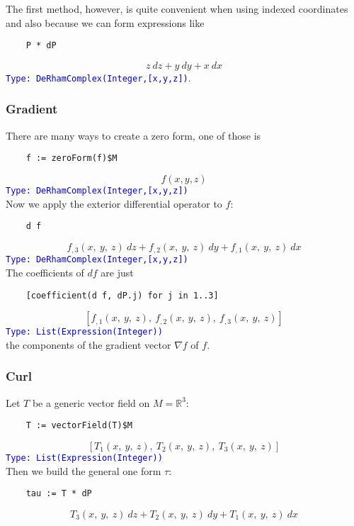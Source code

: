 \documentclass[12pt,a4paper]{article}
\newcommand{\RR}[1]{\mathbb{R}^{#1}}
\newcommand{\type}[1]{\textcolor{blue}{\tt\tiny #1}}
\begin{document}
The first method, however, is quite convenient when using indexed coordinates
and also because we can form expressions like
\begin{lstlisting}
    P * dP
\end{lstlisting}
\begin{displaymath}
   z\ dz + y\ dy + x\ dx
\end{displaymath}
\type{Type: DeRhamComplex(Integer,[x,y,z])}.
%
\subsubsection{Gradient} 
There are many ways to create a zero form, one of those is
\begin{lstlisting}
    f := zeroForm(f)$M
\end{lstlisting}
\begin{displaymath}
   f(x,y,z)
\end{displaymath}
\type{Type: DeRhamComplex(Integer,[x,y,z])}
\\
Now we apply the exterior differential operator to $f$:
\begin{lstlisting}
    d f
\end{lstlisting}
\begin{displaymath}
   {{{f _ {{,3}}}\left(
   {x, \: y, \: z}\right)}
   \  dz}+{{{f _ {{,2}}}\left({x, \: y, \: z}
   \right)}\  dy}+{{{f _ {{,1}}}
   \left({x, \: y, \: z}\right)}\  dx}
\end{displaymath}
\type{Type: DeRhamComplex(Integer,[x,y,z])}
\\
The coefficients of $df$ are just
\begin{lstlisting}
    [coefficient(d f, dP.j) for j in 1..3]
\end{lstlisting}
\begin{displaymath}
  \left[{{f _ {{,1}}}\left({x, \: y, \: z}
  \right)},\: {{f _ {{,2}}}\left(
  {x, \: y, \: z}\right)},
  \: {{f _ {{,3}}}\left({x, \: y, \: z}\right)}\right]
\end{displaymath}
\type{Type: List(Expression(Integer))}
\\ 
the components of the gradient vector $\nabla f$ of $f$.
%
\subsubsection{Curl}
Let $T$ be a generic vector field on $M=\RR 3$:
\begin{lstlisting}
    T := vectorField(T)$M
\end{lstlisting}
\begin{displaymath}
    \left[{{T _ {1}}\left({x, \: y, \: z}\right)},\: {{T _ {2}}
    \left({x, \: y, \: z}\right)},\: {{T _ {3}}\left({x, \: y, \: z}
    \right)}\right]
\end{displaymath}
\type{Type: List(Expression(Integer))}
\\
Then we build the general one form $\tau$:
\begin{lstlisting}
    tau := T * dP
\end{lstlisting}
\begin{displaymath}
    T_3\left(x, \: y, \: z\right)\  dz+T_2
   \left({x, \: y, \: z}
   \right)\  dy+T_1\left({x, \: y, \: z}\right)\  dx
\end{displaymath}
\end{document}
